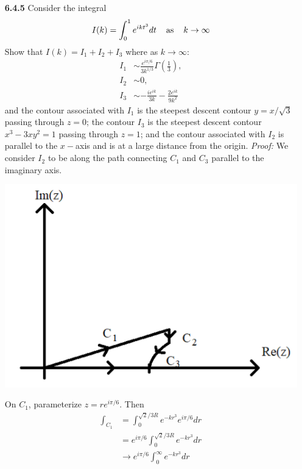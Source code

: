 \documentclass{article}
\begin{document}
\begin{itemize}
    \pagebreak
    \item[\textbf{6.4.5}] Consider the integral
    \[I(k) = \int_0^1 e^{ikt^3}dt \hspace{0.4cm} \text{as} \hspace{0.4cm} k \to \infty\]
    Show that $I(k) = I_1 + I_2 + I_3$ where as $k \to \infty$:
    \begin{align*}
        I_1 &\sim \frac{e^{i\pi/6}}{3k^{1/3}}\Gamma\left(\frac{1}{3}\right),\\
        I_2 &\sim 0,\\
        I_3 &\sim -\frac{ie^{ik}}{3k} - \frac{2e^{ik}}{9k^2}
    \end{align*}
    and the contour associated with $I_1$ is the steepest descent contour $y = x/\sqrt{3}$ passing through $z = 0$; the contour $I_3$ is the steepest descent contour $x^3 - 3xy^2 = 1$ passing through $z = 1$; and the contour associated with $I_2$ is parallel to the $x-$axis and is at a large distance from the origin.
    \newline\newline
    \textit{Proof:} We consider $I_2$ to be along the path connecting $C_1$ and $C_3$ parallel to the imaginary axis. 
    \begin{center}
        \includegraphics[scale = 0.4]{prob5contour.PNG}
    \end{center}
    On $C_1$, parameterize $z = re^{i\pi/6}$. Then
    \begin{align*}
        \int_{C_1} &= \int_0^{\sqrt{2}/3R} e^{-kr^3}e^{i\pi/6}dr\\
        &= e^{i\pi/6}\int_0^{\sqrt{2}/3R}e^{-kr^3}dr\\
        &\to e^{i\pi/6}\int_0^{\infty} e^{-kr^3}dr\\

\end{align*}
\end{itemize}
\end{document}
